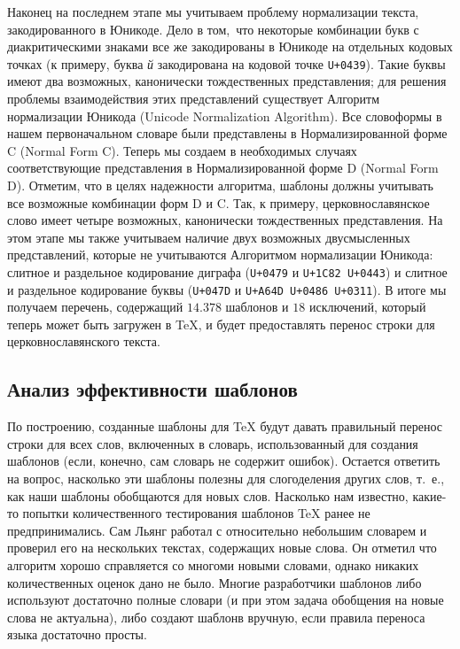 \documentclass[12pt,a4paper,oneside]{extarticle}
\begin{document}
Наконец на последнем этапе мы учитываем проблему нормализации текста, закодированного в Юникоде. Дело в том, что некоторые комбинации букв 
с диакритическими знаками все же закодированы в Юникоде на отдельных кодовых точках (к примеру, буква \emph{й} закодирована на кодовой 
точке \verb!U+0439!). Такие буквы имеют два возможных, канонически тождественных представления; для решения проблемы взаимодействия этих 
представлений существует Алгоритм нормализации Юникода (\textenglish{Unicode Normalization Algorithm})\autocite[Подробности см. ][]{tr15}. 
Все словоформы в нашем первоначальном словаре были представлены в Нормализированной форме C (\textenglish{Normal Form C}). Теперь мы создаем 
в необходимых случаях соответствующие представления в Нормализированной форме D (\textenglish{Normal Form D}). Отметим, что в целях 
надежности алгоритма, шаблоны должны учитывать все возможные комбинации форм D и C. Так, к примеру, церковнославянское слово 
 имеет четыре возможных, канонически тождественных представления. На этом этапе мы также учитываем наличие 
двух возможных двусмысленных представлений, которые не учитываются Алгоритмом нормализации Юникода: слитное и раздельное кодирование диграфа 
 (\verb!U+0479! и \verb!U+1C82 U+0443!) и слитное и раздельное кодирование буквы 
 (\verb!U+047D! и \verb!U+A64D U+0486 U+0311!)\autocite[Специфику нормализации церковнославянского текста см. в 
работе ][]{utn41}. В итоге мы получаем перечень, содержащий $14.378$ шаблонов и $18$ исключений, который теперь может быть загружен 
в \TeX{}, и будет предоставлять перенос строки для церковнославянского текста.

\subsection{Анализ эффективности шаблонов}

По построению, созданные шаблоны для \TeX{} будут давать правильный перенос строки для всех слов, включенных в словарь, использованный 
для создания шаблонов (если, конечно, сам словарь не содержит ошибок). Остается ответить на вопрос, насколько эти шаблоны полезны для 
слогоделения других слов, т.~е., как наши шаблоны обобщаются для новых слов. Насколько нам известно, какие-то попытки количественного
тестирования шаблонов \TeX{} ранее не предпринимались. Сам Льянг работал с относительно небольшим словарем и проверил его на нескольких
текстах, содержащих новые слова. Он отметил что алгоритм хорошо справляется со многоми новыми словами, однако никаких количественных
оценок дано не было. Многие разработчики шаблонов либо используют достаточно полные словари (и при этом задача обобщения на новые
слова не актуальна), либо создают шаблонв вручную, если правила переноса языка достаточно просты.
\end{document}
